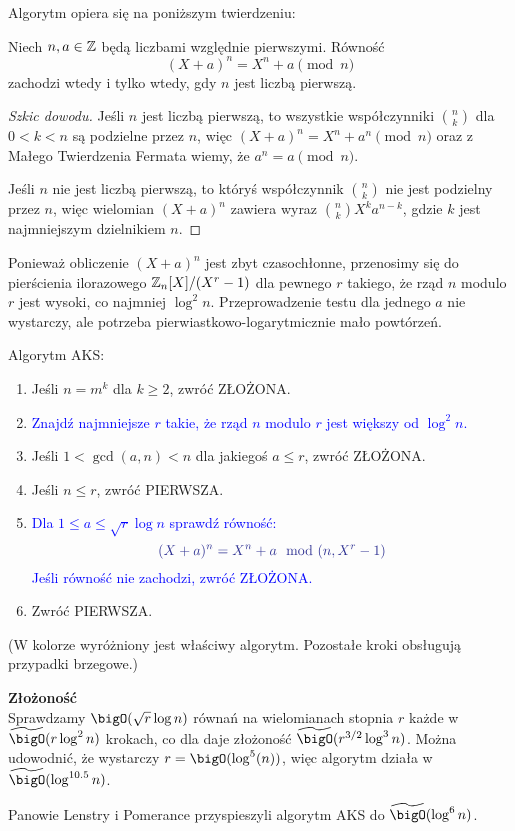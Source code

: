 Algorytm opiera się na poniższym twierdzeniu:

\begin{theorem}
	Niech \( n, a \in \mathbb{Z} \) będą liczbami względnie pierwszymi. Równość
	\[
		(X + a)^n = X^n + a \pmod{n}
	\]
	zachodzi wtedy i tylko wtedy, gdy \( n \) jest liczbą pierwszą.
\end{theorem}
\begin{proof}[Szkic dowodu]
	Jeśli \( n \) jest liczbą pierwszą, to wszystkie współczynniki \( n \choose k \) dla \( 0 < k < n \) są podzielne przez \( n \), więc \( (X + a)^n = X^n + a^n \pmod{n} \) oraz z Małego Twierdzenia Fermata wiemy, że \( a^n = a \pmod{n} \).

	Jeśli \( n \) nie jest liczbą pierwszą, to któryś współczynnik \( n \choose k \) nie jest podzielny przez \( n \), więc wielomian \( (X + a)^n \) zawiera wyraz \( {n \choose k} X^ka^{n-k} \), gdzie \( k \) jest najmniejszym dzielnikiem \( n \).
\end{proof}

Ponieważ obliczenie \( (X + a)^n \) jest zbyt czasochłonne, przenosimy się do pierścienia ilorazowego \( \mathbb{Z}_n[X]/(X^r - 1) \) dla pewnego \( r \) takiego, że rząd \( n \)
modulo \( r \) jest wysoki, co najmniej \( \log^2n \). Przeprowadzenie testu dla jednego \( a \) nie wystarczy, ale potrzeba pierwiastkowo-logarytmicznie mało powtórzeń.

\newpage
\begin{greyframe}
	Algorytm AKS:
	\begin{enumerate}
		\item Jeśli \( n = m^k \) dla \( k \geq 2 \), zwróć ZŁOŻONA.
		\item \textcolor{Blue}{Znajdź najmniejsze \( r \) takie, że rząd \( n \) modulo \( r \) jest większy od \( \log^2n \).}
		\item Jeśli \( 1 < \gcd(a, n) < n \) dla jakiegoś \( a \leq r \), zwróć ZŁOŻONA.
		\item Jeśli \( n \leq r \), zwróć PIERWSZA.
		\item \textcolor{Blue}{Dla \( 1 \leq a \leq \sqrt{r}\log n \) sprawdź równość:}
		      \[
			      \textcolor{Blue}{(X + a)^n = X^n + a \mod (n, X^r-1)}
		      \]
		      \textcolor{Blue}{Jeśli równość nie zachodzi, zwróć ZŁOŻONA.}
		\item Zwróć PIERWSZA.
	\end{enumerate}
\end{greyframe}
{\small (W kolorze wyróżniony jest właściwy algorytm. Pozostałe kroki obsługują przypadki brzegowe.)}

\textbf{Złożoność} \\
Sprawdzamy \( \bigO(\sqrt{r} \log n) \) równań na wielomianach stopnia \( r \) każde w \( \widetilde{\bigO}(r \log^2n) \) krokach, co dla daje złożoność \( \widetilde{\bigO}(r^{3/2} \log^3n) \). Można udowodnić, że wystarczy \( r = \bigO(\log^5(n)) \), więc algorytm działa w \( \widetilde{\bigO}(\log^{10.5}n)\).

Panowie Lenstry i Pomerance przyspieszyli algorytm AKS do \( \widetilde{\bigO}(\log^6n) \).
